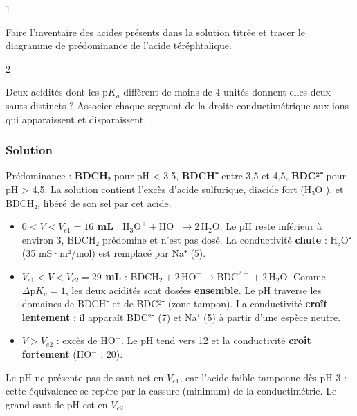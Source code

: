 \documentclass[11pt,a4paper]{article}
\providecommand{\tightlist}{\setlength{\itemsep}{0pt}\setlength{\parskip}{0pt}}
\begin{document}
\begin{indication}{1}

Faire l'inventaire des acides présents dans la solution titrée et tracer le diagramme de prédominance de l'acide téréphtalique.

\end{indication}

\begin{indication}{2}

Deux acidités dont les p\(K_a\) diffèrent de moins de 4 unités donnent-elles deux sauts distincts ? Associer chaque segment de la droite conductimétrique aux ions qui apparaissent et disparaissent.

\end{indication}

\hypertarget{solution-17}{%
\subsubsection{Solution}\label{solution-17}}

Prédominance : \textbf{BDCH₂} pour pH \textless{} 3,5, \textbf{BDCH⁻} entre 3,5 et 4,5, \textbf{BDC²⁻} pour pH \textgreater{} 4,5. La solution contient l'excès d'acide sulfurique, diacide fort (H₃O⁺), et BDCH₂, libéré de son sel par cet acide.

\begin{itemize}
\tightlist
\item
  \textbf{\(0<V<V_{e1}=16\) mL} : \(\mathrm{H_3O^+}+\mathrm{HO^-}\to2\,\mathrm{H_2O}\). Le pH reste inférieur à environ 3, BDCH₂ prédomine et n'est pas dosé. La conductivité \textbf{chute} : H₃O⁺ (35 mS·m²/mol) est remplacé par Na⁺ (5).
\item
  \textbf{\(V_{e1}<V<V_{e2}=29\) mL} : \(\mathrm{BDCH_2}+2\,\mathrm{HO^-}\to\mathrm{BDC^{2-}}+2\,\mathrm{H_2O}\). Comme \(\Delta\mathrm pK_a=1\), les deux acidités sont dosées \textbf{ensemble}. Le pH traverse les domaines de BDCH⁻ et de BDC²⁻ (zone tampon). La conductivité \textbf{croît lentement} : il apparaît BDC²⁻ (7) et Na⁺ (5) à partir d'une espèce neutre.
\item
  \textbf{\(V>V_{e2}\)} : excès de HO\(^-\). Le pH tend vers 12 et la conductivité \textbf{croît fortement} (HO\(^-\) : 20).
\end{itemize}

Le pH ne présente pas de saut net en \(V_{e1}\), car l'acide faible tamponne dès pH 3 : cette équivalence se repère par la cassure (minimum) de la conductimétrie. Le grand saut de pH est en \(V_{e2}\).
\end{document}
